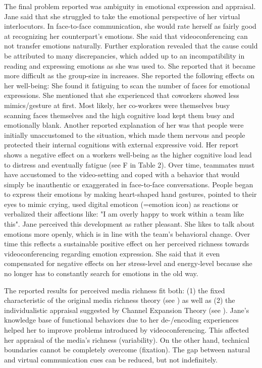 \documentclass[man]{apa7}
\begin{document}
The final problem reported was ambiguity in emotional expression and appraisal. Jane said that she struggled to take the emotional perspective of her virtual interlocutors. In face-to-face communication, she would rate herself as fairly good at recognizing her counterpart's emotions. She said that videoconferencing can not transfer emotions naturally. Further exploration revealed that the cause could be attributed to many discrepancies, which added up to an incompatibility in reading and expressing emotions as she was used to. She reported  that it became more difficult as the group-size in increases. She reported the following effects on her well-being: She found it fatiguing to scan the number of faces for emotional expressions. She mentioned that she experienced that coworkers showed less mimics/gesture at first. Most likely, her co-workers were themselves busy scanning faces themselves and the high cognitive load kept them busy and emotionally blank. Another reported explanation of her was  that people were initially unaccustomed to the situation, which made them nervous and people protected their internal cognitions with external expressive void. Her report shows a negative effect on a workers well-being as the higher cognitive load lead to distress and eventually fatigue (see F in Table 2). Over time, teammates must have accustomed to the video-setting and coped with a behavior that would simply be inauthentic or exaggerated in face-to-face conversations. People began to express their emotions by making heart-shaped hand gestures, pointed to their eyes to mimic crying, used digital emoticon (=emotion icon) as reactions or verbalized their affections like: "I am overly happy to work within a team like this". Jane perceived this development as rather pleasant. She likes to talk about emotions more openly, which is in line with the team's behavioral change. Over time this reflects a sustainable positive effect on her perceived richness towards videoconferencing regarding emotion expression. She said that it even compensated for negative effects on her stress-level and energy-level because she no longer has to constantly search for emotions in the old way.

The reported results for perceived media richness fit both: (1) the fixed characteristic of the original media richness theory (see \cite{daft1983information}) as well as (2) the individualistic appraisal suggested by Channel Expansion Theory (see \cite{Carlson1999}). Jane's knowledge base of functional behaviors due to her de-/encoding experiences helped her to improve problems introduced by videoconferencing. This affected her appraisal of the media's richness (variability). On the other hand, technical boundaries cannot be completely overcome (fixation). The gap between natural and virtual communication cues can be reduced, but not indefinitely.
\end{document}
